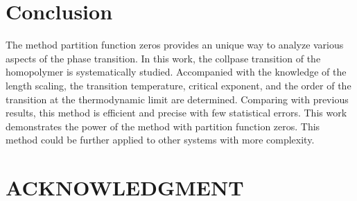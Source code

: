 \documentclass[preprint,preprintnumbers,amsmath,amssymb,showpacs,aps,pre]{revtex4-1}
\begin{document}
\section{Conclusion}

The method partition function zeros provides an unique way to analyze various
aspects of the phase transition. In this work, the collpase transition of the
homopolymer is systematically studied. Accompanied with the knowledge of the
length scaling, the transition temperature, critical exponent, and the order
of the transition at the thermodynamic limit are determined. Comparing with
previous results, this method is efficient and precise with few statistical
errors. This work demonstrates the power of the method with partition function
zeros. This method could be further applied to other systems with more
complexity.

\section*{ACKNOWLEDGMENT}
\end{document}
